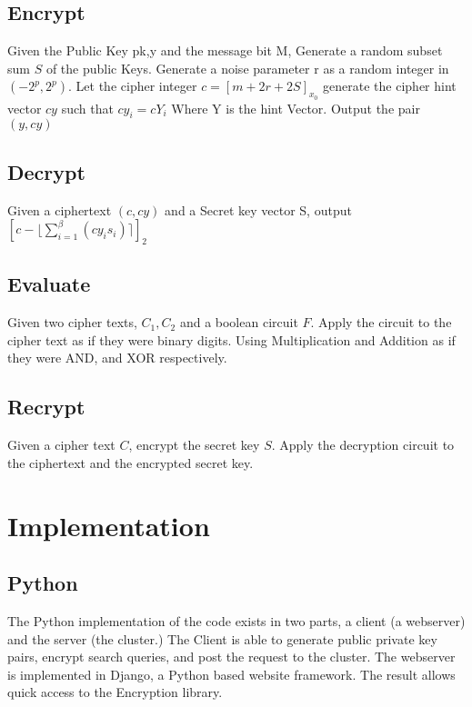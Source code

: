 \documentclass[letterpaper,11pt]{article} %
\begin{document}
\subsection*{Encrypt}
Given the Public Key pk,y and the message bit M, Generate a random subset sum $S$ of the public Keys. Generate a noise parameter r as a random integer in $(-2^p,2^p)$. Let the cipher integer $c=[m+2r+2S]_{x_0}$ generate the cipher hint vector $cy$ such that $cy_i=cY_i$
Where Y is the hint Vector. Output the pair $(y,cy)$\\

\subsection*{Decrypt}
	Given a ciphertext $(c,cy)$ and a Secret key vector S, output $[c-\lfloor \sum\limits_{i=1}^\beta (cy_is_i) \rceil ]_2$\\
\subsection*{Evaluate}
Given two cipher texts, $C_1, C_2$ and a boolean circuit $F$. Apply the circuit to the cipher text as if they were binary digits. Using Multiplication and Addition as if they were AND, and XOR respectively. 
\subsection*{Recrypt}
Given a cipher text $C$, encrypt the secret key $S$. Apply the decryption circuit to the ciphertext and the encrypted secret key.
\\
\section*{Implementation}
\subsection*{Python}
The Python implementation of the code exists in two parts, a client (a webserver) and the server (the cluster.) The Client is able to generate public private key pairs, encrypt search queries, and post the request to the cluster. The webserver is implemented in Django, a Python based website framework. The result allows quick access to the Encryption library.\\
\end{document}

